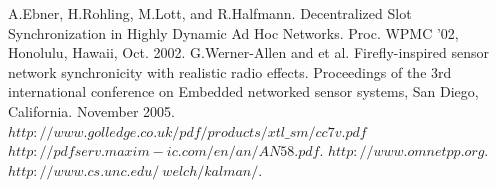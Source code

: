 \documentclass[a4paper,10pt]{report}
\begin{document}
\begin{thebibliography}{\textbf{References}}
A.Ebner, H.Rohling, M.Lott, and R.Halfmann. Decentralized Slot Synchronization in Highly Dynamic Ad Hoc Networks. Proc. WPMC '02, Honolulu, Hawaii, Oct. 2002.
G.Werner-Allen and et al. Firefly-inspired sensor network synchronicity with realistic radio effects. Proceedings of the 3rd international conference on Embedded networked sensor systems, San Diego, California. November 2005.
 $http://www.golledge.co.uk/pdf/products/xtl\_sm/cc7v.pdf$
 $http://pdfserv.maxim-ic.com/en/an/AN58.pdf$.
$http://www.omnetpp.org$.
$http://www.cs.unc.edu/~welch/kalman/$.
\end{thebibliography}
\end{document}
